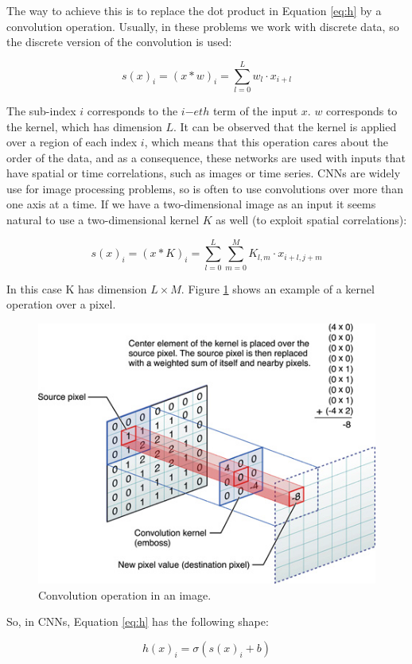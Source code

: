 The way to achieve this is to replace the dot product in Equation \ref{eq:h} by a convolution operation. Usually, in these problems we work with discrete data, so the discrete version of the convolution is used:

\begin{equation}
    s(x)_{i} = (x * w)_{i} = \sum_{l=0}^{L}w_{l} \cdot x_{i+l}
\end{equation}
    
The sub-index $i$ corresponds to the $i\mathrm{-}eth$ term of the input $x$. $w$ corresponds to the kernel, which has dimension $L$. It can be observed that the kernel is applied over a region of each index $i$, which means that this operation cares about the order of the data, and as a consequence, these networks are used with inputs that have spatial or time correlations, such as images or time series. CNNs are widely use for image processing problems, so is often to use convolutions over more than one axis at a time. If we have a two-dimensional image as an input it seems natural to use a two-dimensional kernel $K$ as well (to exploit spatial correlations):

\begin{equation}
    s(x)_{i} = (x * K)_{i} = \sum_{l=0}^{L}\sum_{m=0}^{M}K_{l, m} \cdot x_{i+l, j+m}
\end{equation}

In this case K has dimension $L \times M$. Figure \ref{fig:conv} shows an example of a kernel operation over a pixel.

\begin{figure}[H]
    \centering
    \includegraphics[width=0.4\linewidth]{imagenes/cap1/convolution.jpg}
    \caption{Convolution operation in an image.}
    \label{fig:conv}
\end{figure}

So, in CNNs, Equation \ref{eq:h} has the following shape:

\begin{equation}
    h(x)_{i} = \sigma(s(x)_{i} + b)
    \label{eq:h2}
\end{equation}

